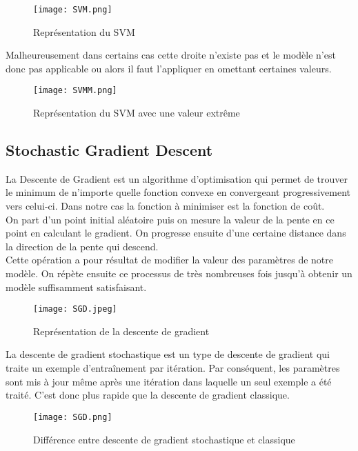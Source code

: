 \documentclass[a4paper,french,12pt]{article}
\begin{document}
\begin{figure}[!h]
    \centering
    \texttt{[image: SVM.png]}
    \caption{Représentation du SVM}
\end{figure}

Malheureusement dans certains cas cette droite n'existe pas et le modèle n'est donc pas applicable ou alors il faut l'appliquer en omettant certaines valeurs.

\begin{figure}[!h]
    \centering
    \texttt{[image: SVMM.png]}
    \caption{Représentation du SVM avec une valeur extrême}
\end{figure}

\subsection{Stochastic Gradient Descent}

La Descente de Gradient est un algorithme d’optimisation qui permet de trouver le minimum de n’importe quelle fonction convexe en convergeant progressivement vers celui-ci. Dans notre cas la fonction à minimiser est la fonction de coût.\\

On part d’un point initial aléatoire puis on mesure la valeur de la pente en ce point en calculant le gradient. On progresse ensuite d’une certaine distance dans la direction de la pente qui descend.\\

Cette opération a pour résultat de modifier la valeur des paramètres de notre modèle. On répète ensuite ce processus de très nombreuses fois jusqu'à obtenir un modèle suffisamment satisfaisant.

\begin{figure}[!h]
    \centering
    \texttt{[image: SGD.jpeg]}
    \caption{Représentation de la descente de gradient}
\end{figure}

La descente de gradient stochastique est un type de descente de gradient qui traite un exemple d’entraînement par itération. Par conséquent, les paramètres sont mis à jour même après une itération dans laquelle un seul exemple a été traité. C’est donc plus rapide que la descente de gradient classique.

\begin{figure}[!h]
    \centering
    \texttt{[image: SGD.png]}
    \caption{Différence entre descente de gradient stochastique et classique}
\end{figure}
\end{document}
